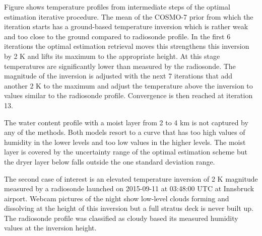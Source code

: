     Figure  shows temperature profiles from intermediate
    steps of the optimal estimation iterative procedure. The mean of the
    COSMO-7 prior from which the iteration starts has a ground-based
    temperature inversion which is rather weak and too close to the ground
    compared to radiosonde profile. In the first 6 iterations the optimal
    estimation retrieval moves this strengthens this inversion by 2 K and
    lifts its maximum to the appropriate height. At this stage temperatures
    are significantly lower than measured by the radiosonde. The magnitude
    of the inversion is adjusted with the next 7 iterations that add another
    2 K to the maximum and adjust the temperature above the inversion to
    values similar to the radiosonde profile. Convergence is then reached at
    iteration 13.

    The water content profile with a moist layer from 2 to 4 km is not captured
    by any of the methods. Both models resort to a curve that has too high
    values of humidity in the lower levels and too low values in the higher
    levels. The moist layer is covered by the uncertainty range of the optimal
    estimation scheme but the dryer layer below falls outside the one standard
    deviation range.

        {}

\stopsubsection

\startsubsection[title={Elevated Temperature Inversion}]

    The second case of interest is an elevated temperature inversion of 2 K
    magnitude measured by a radiosonde launched on 2015-09-11 at 03:48:00 UTC
    at Innsbruck airport. Webcam pictures of the night show low-level clouds
    forming and dissolving at the height of this inversion but a full stratus
    deck is never built up. The radiosonde profile was classified as cloudy
    based its measured humidity values at the inversion height.

